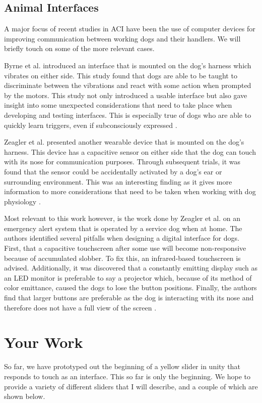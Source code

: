 \documentclass[conference]{IEEEtran}
\begin{document}
    \subsection{Animal Interfaces}
        A major focus of recent studies in ACI have been the use of computer devices for improving communication between working dogs and their handlers. We will briefly touch on some of the more relevant cases.
        
        Byrne et al. introduced an interface that is mounted on the dog’s harness which vibrates on either side. This study found that dogs are able to be taught to discriminate between the vibrations and react with some action when prompted by the motors. This study not only introduced a usable interface but also gave insight into some unexpected considerations that need to take place when developing and testing interfaces. This is especially true of dogs who are able to quickly learn triggers, even if subconsciously expressed \cite{Byrne2014}.
        
        Zeagler et al. presented another wearable device that is mounted on the dog’s harness. This device has a capacitive sensor on either side that the dog can touch with its nose for communication purposes. Through subsequent trials, it was found that the sensor could be accidentally activated by a dog’s ear or surrounding environment. This was an interesting finding as it gives more information to more considerations that need to be taken when working with dog physiology \cite{Zeagler2016a}.
        
        Most relevant to this work however, is the work done by Zeagler et al. on an emergency alert system that is operated by a service dog when at home. The authors identified several pitfalls when designing a digital interface for dogs. First, that a capacitive touchscreen after some use will become non-responsive because of accumulated slobber. To fix this, an infrared-based touchscreen is advised. Additionally, it was discovered that a constantly emitting display such as an LED monitor is preferable to say a projector which, because of its method of color emittance, caused the dogs to lose the button positions. Finally, the authors find that larger buttons are preferable as the dog is interacting with its nose and therefore does not have a full view of the screen \cite{Zeagler2014}.

    \section{Your Work}
        So far, we have prototyped out the beginning of a yellow slider in unity that responds to touch as an interface. This so far is only the beginning. We hope to provide a variety of different sliders that I will describe, and a couple of which are shown below.
\end{document}
